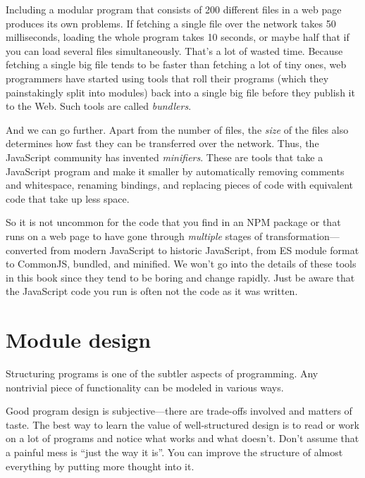 Including a modular program that consists of 200 different files in a web page produces its own problems. If fetching a single file over the network takes 50 milliseconds, loading the whole program takes 10 seconds, or maybe half that if you can load several files simultaneously. That's a lot of wasted time. Because fetching a single big file tends to be faster than fetching a lot of tiny ones, web programmers have started using tools that roll their programs (which they painstakingly split into modules) back into a single big file before they publish it to the Web. Such tools are called \emph{bundlers}.

And we can go further. Apart from the number of files, the \emph{size} of the files also determines how fast they can be transferred over the network. Thus, the JavaScript community has invented \emph{minifiers}. These are tools that take a JavaScript program and make it smaller by automatically removing comments and whitespace, renaming bindings, and replacing pieces of code with equivalent code that take up less space.

So it is not uncommon for the code that you find in an NPM package or that runs on a web page to have gone through \emph{multiple} stages of transformation—converted from modern JavaScript to historic JavaScript, from ES module format to CommonJS, bundled, and minified. We won't go into the details of these tools in this book since they tend to be boring and change rapidly. Just be aware that the JavaScript code you run is often not the code as it was written.

\section{Module design}

Structuring programs is one of the subtler aspects of programming. Any nontrivial piece of functionality can be modeled in various ways.

Good program design is subjective—there are trade-offs involved and matters of taste. The best way to learn the value of well-structured design is to read or work on a lot of programs and notice what works and what doesn't. Don't assume that a painful mess is ``just the way it is''. You can improve the structure of almost everything by putting more thought into it.

